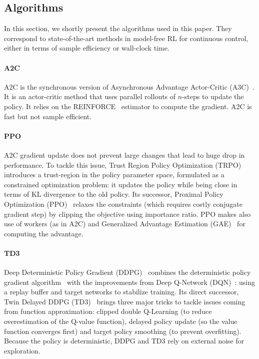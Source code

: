 \documentclass{article}
\newcommand{\aac}{\textsc{A2C}\xspace}
\newcommand{\ppo}{\textsc{PPO}\xspace}
\newcommand{\tddd}{\textsc{TD3}\xspace}
\begin{document}
\subsection{Algorithms}
\label{sec:algorithms}

In this section, we shortly present the algorithms used in this paper. They correspond to state-of-the-art methods in model-free RL for continuous control, either in terms of sample efficiency or wall-clock time.

\paragraph{\aac}
\aac is the synchronous version of Asynchronous Advantage Actor-Critic (A3C)~\citep{mnih2016asynchronous}.
It is an actor-critic method that uses parallel rollouts of $n$-steps to update the policy. It relies on the \textsc{REINFORCE}~\citep{williams1992simple} estimator to compute the gradient. \aac is fast but not sample efficient.


\paragraph{\ppo}
\aac gradient update does not prevent large changes that lead to huge drop in performance.
To tackle this issue, Trust Region Policy Optimization (TRPO)~\citep{schulman2015trust} introduces a trust-region in the policy parameter space, formulated as a constrained optimization problem: it updates the policy while being close in terms of KL divergence to the old policy.
Its successor, Proximal Policy Optimization (\ppo)~\citep{schulman2017proximal} relaxes the constraints (which requires costly conjugate gradient step) by clipping the objective using importance ratio. \ppo makes also use of workers (as in \aac) and Generalized Advantage Estimation (GAE)~\citep{schulman2015high} for computing the advantage.


\paragraph{\tddd}
Deep Deterministic Policy Gradient (DDPG)~\citep{lillicrap2015continuous} combines the deterministic policy gradient algorithm~\citep{silver2014deterministic} with the improvements from Deep Q-Network (DQN)~\citep{mnih2013playing}: using a replay buffer and target networks to stabilize training.
Its direct successor, Twin Delayed DDPG (\tddd)~\citep{fujimoto2018addressing} brings three major tricks to tackle issues coming from function approximation: clipped double Q-Learning (to reduce overestimation of the Q-value function), delayed policy update (so the value function converges first) and target policy smoothing (to prevent overfitting).
Because the policy is deterministic, DDPG and \tddd rely on external noise for exploration.
\end{document}
